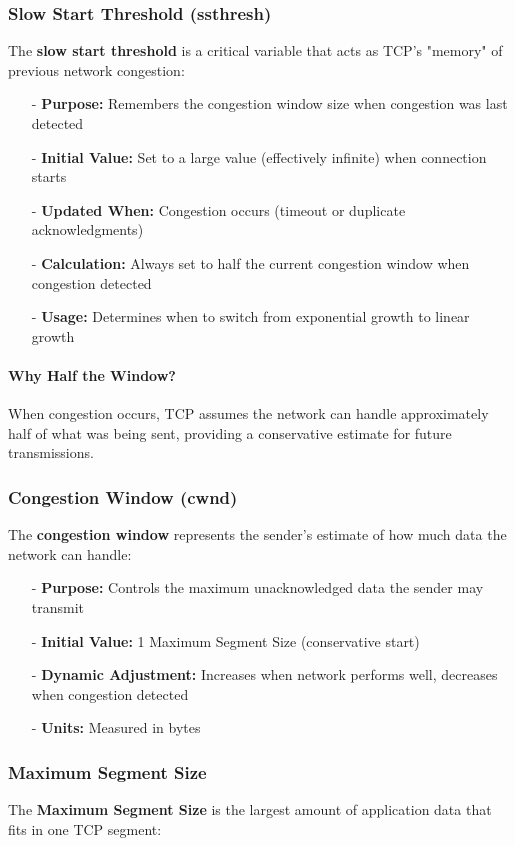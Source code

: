 \documentclass[../../compsys.tex]{subfiles}
\begin{document}
\subsubsection{Slow Start Threshold (ssthresh)}
The \textbf{slow start threshold} is a critical variable that acts as TCP's "memory" of previous network congestion:

\begin{itemize}
  \item[-] \textbf{Purpose:} Remembers the congestion window size when congestion was last detected
  \item[-] \textbf{Initial Value:} Set to a large value (effectively infinite) when connection starts
  \item[-] \textbf{Updated When:} Congestion occurs (timeout or duplicate acknowledgments)
  \item[-] \textbf{Calculation:} Always set to half the current congestion window when congestion detected
  \item[-] \textbf{Usage:} Determines when to switch from exponential growth to linear growth
\end{itemize}

\paragraph{Why Half the Window?} When congestion occurs, TCP assumes the network can handle approximately half of what was being sent, providing a conservative estimate for future transmissions.

\subsubsection{Congestion Window (cwnd)}
The \textbf{congestion window} represents the sender's estimate of how much data the network can handle:

\begin{itemize}
  \item[-] \textbf{Purpose:} Controls the maximum unacknowledged data the sender may transmit
  \item[-] \textbf{Initial Value:} 1 Maximum Segment Size (conservative start)
  \item[-] \textbf{Dynamic Adjustment:} Increases when network performs well, decreases when congestion detected
  \item[-] \textbf{Units:} Measured in bytes
\end{itemize}

\subsubsection{Maximum Segment Size}
The \textbf{Maximum Segment Size} is the largest amount of application data that fits in one TCP segment:
\end{document}
